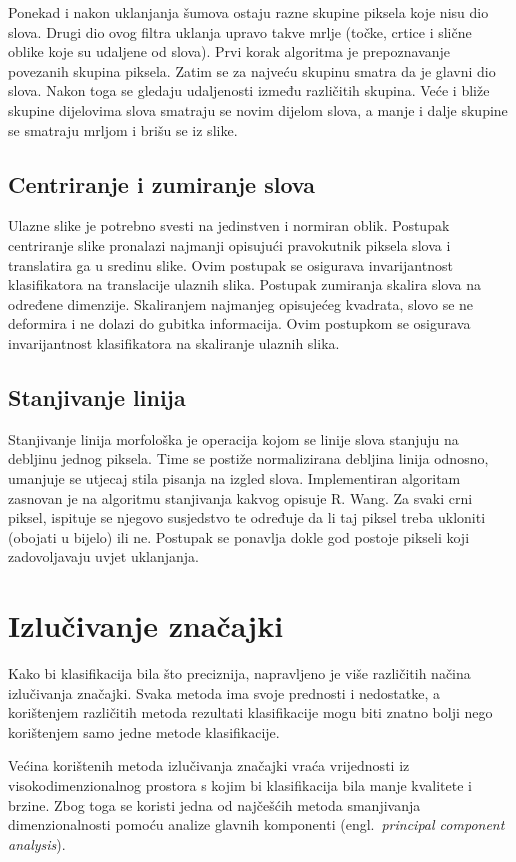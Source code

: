 \documentclass[a4paper,twocolumn,dvipdfm]{article}
\begin{document}
Ponekad i nakon uklanjanja šumova ostaju razne skupine piksela koje nisu dio
slova. Drugi dio ovog filtra uklanja upravo takve mrlje (točke, crtice i slične
oblike koje su udaljene od slova). Prvi korak algoritma je prepoznavanje
povezanih skupina piksela. Zatim se za najveću skupinu smatra da je glavni dio
slova. Nakon toga se gledaju udaljenosti između različitih skupina. Veće i
bliže skupine dijelovima slova smatraju se novim dijelom slova, a manje i dalje
skupine se smatraju mrljom i brišu se iz slike.

\subsection{Centriranje i zumiranje slova}
Ulazne slike je potrebno svesti na jedinstven i normiran oblik. Postupak 
centriranje slike pronalazi najmanji opisujući pravokutnik piksela slova  
i translatira ga u sredinu slike. Ovim postupak se osigurava invarijantnost
klasifikatora na translacije ulaznih slika. Postupak zumiranja skalira slova 
na određene dimenzije. Skaliranjem najmanjeg opisujećeg kvadrata, slovo se 
ne deformira i ne dolazi do gubitka informacija. Ovim postupkom se osigurava 
invarijantnost klasifikatora na skaliranje ulaznih slika.

\subsection{Stanjivanje linija}
Stanjivanje linija morfološka je operacija kojom se linije slova stanjuju na debljinu jednog piksela. Time se postiže normalizirana debljina linija odnosno, umanjuje se utjecaj stila pisanja na izgled slova. Implementiran algoritam zasnovan je na algoritmu stanjivanja kakvog opisuje R. Wang\cite{Wang2004Online}. Za svaki crni piksel, ispituje se njegovo susjedstvo te određuje da li taj piksel treba ukloniti (obojati u bijelo) ili ne. Postupak se ponavlja dokle god postoje pikseli koji zadovoljavaju uvjet uklanjanja.

\section{Izlučivanje značajki}
Kako bi klasifikacija bila što preciznija, napravljeno je više različitih načina
izlučivanja značajki. Svaka metoda ima svoje prednosti i nedostatke, a
korištenjem različitih metoda rezultati klasifikacije mogu biti znatno bolji
nego korištenjem samo jedne metode klasifikacije.

Većina korištenih metoda izlučivanja značajki vraća vrijednosti iz
visokodimenzionalnog prostora s kojim bi klasifikacija bila manje kvalitete i
brzine. Zbog toga se koristi jedna od najčešćih metoda smanjivanja
dimenzionalnosti pomoću analize glavnih komponenti (engl.\ \emph{principal
component analysis}).
\end{document}
